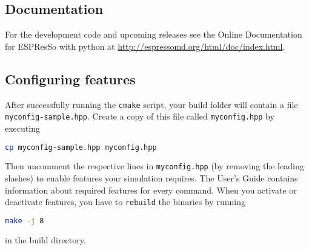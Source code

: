 \documentclass[
paper=a4,                       %
fontsize=11pt,                  %
headinclude=false,              %
footinclude=false,              %
pagesize,                       %
]{scrartcl}
\begin{document}
\subsection{Documentation}

For the development code and upcoming releases see the Online Documentation for
ESPResSo with python at \url{http://espressomd.org/html/doc/index.html}.

\subsection{Configuring features}
%
After successfully running the \verb!cmake! script, your build folder will contain a file \\ \texttt{myconfig-sample.hpp}. Create a copy of this file called \texttt{myconfig.hpp} by executing
\begin{lstlisting}[language=bash]
cp myconfig-sample.hpp myconfig.hpp
\end{lstlisting}
%
Then uncomment the respective lines in \texttt{myconfig.hpp} (by removing the leading slashes) to enable features your simulation requires. The User's Guide contains information about required features for every \es{} command.
When you activate or deactivate features, you have to \verb!rebuild! the binaries by running
%
\begin{lstlisting}[language=bash]
make -j 8
\end{lstlisting}
%
in the build directory.
\end{document}
